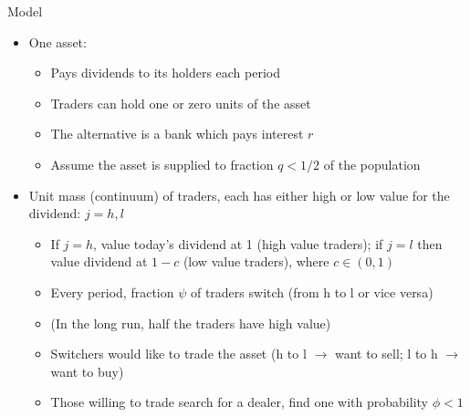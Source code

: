 \documentclass[english,10pt
,aspectratio=169
]{beamer}
\begin{document}
\begin{frame}{\citet*{duffie_over--counter_2005,duffie_valuation_2007} Model} \label{slide:DGP}
\begin{itemize}
	\item One asset: 
	\begin{itemize}
		\item Pays dividends to its holders each period
		\item Traders can hold \alert{one} or \alert{zero units} of the asset
		\item The alternative is a bank which pays interest $r$
		\item Assume the asset is supplied to fraction $q<1/2$ of the population
	\end{itemize}
\item Unit mass (continuum) of traders, each has either high or low value for the dividend: $j=h,l$
	\begin{itemize}
		\item If $j=h$, value today's dividend at 1 (high value traders); if $j=l$ then value dividend at $1-c$ (low value traders), where $c \in (0,1)$
		\item Every period, fraction $\psi$ of traders switch (from h to l or vice versa)
		\item (In the long run, half the traders have high value)
		\item Switchers would like to trade the asset (h to l $\to$ want to sell; l to h $\to$ want to buy)
		\item Those willing to trade search for a dealer, find one with probability $\phi < 1$
	\end{itemize}
\end{itemize}
\end{frame}
\end{document}
